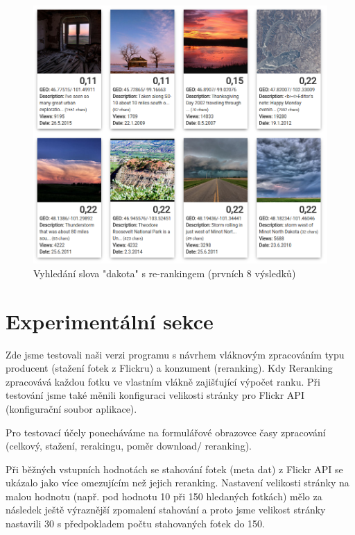 \documentclass[12pt,oneside,a4paper]{article}
\begin{document}
\begin{figure} \begin{center}
\includegraphics[width=13.5cm]{pics/dakota_geo.png} \caption{Vyhledání slova "dakota" s re-rankingem (prvních 8 výsledků)}
\label{fig:dakota_geo}
\end{center} \end{figure}


\section{Experimentální sekce}
Zde jsme testovali naši verzi programu s návrhem vláknovým zpracováním typu producent (stažení fotek z Flickru) a konzument (reranking). Kdy Reranking zpracovává každou fotku ve vlastním vlákně zajišťující výpočet ranku. Při testování jsme také měnili konfiguraci velikosti stránky pro Flickr API (konfigurační soubor aplikace).

Pro testovací účely ponecháváme na formulářové obrazovce časy zpracování (celkový, stažení, rerakingu, poměr download/ reranking).

Při běžných vstupních hodnotách se stahování fotek (meta dat) z Flickr API se ukázalo jako více omezujícím než jejich reranking. Nastavení velikosti stránky na malou hodnotu (např. pod hodnotu 10 při 150 hledaných fotkách) mělo za následek ještě výraznější zpomalení stahování a proto jsme velikost stránky nastavili 30 s předpokladem počtu stahovaných fotek do 150.
\end{document}

